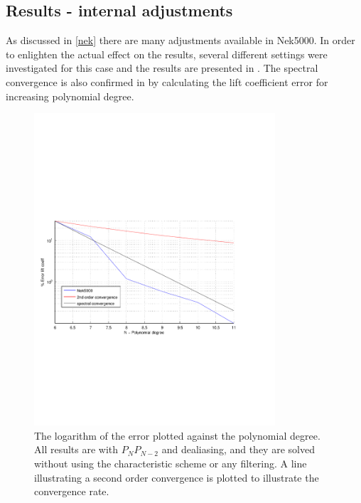 \subsection{Results - internal adjustments }
As discussed in \cref{nek} there are many adjustments available in Nek5000. 
In order to enlighten the actual effect on the results, several different settings were 
investigated for this case and the results are presented in . 
The spectral convergence is also confirmed in  by calculating the 
lift coefficient error for increasing polynomial degree. 
%
\begin{figure}[h]
	\centerline{
        \includegraphics[trim=0.5cm 7cm 0.5cm 7cm, width=0.8\textwidth]{Figures/lift_coef4.pdf}}
	\caption{The logarithm of the error plotted against the polynomial degree. All results 
        are with $P_NP_{N-2}$ and dealiasing, and they are solved without using the 
    characteristic scheme or any filtering. A line illustrating a second order convergence is 
    plotted to illustrate the convergence rate.}
	\label{fig:liftconv}
\end{figure}
%

